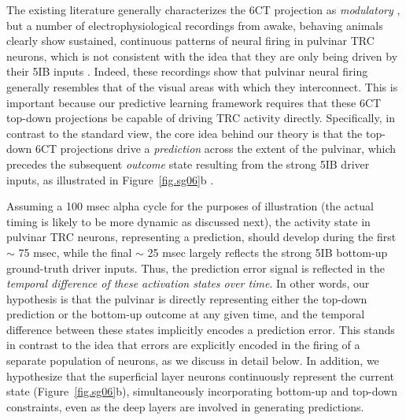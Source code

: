 \documentclass[11pt,twoside]{article}
\newif\myifpdf
\begin{document}
The existing literature generally characterizes the 6CT projection as \emph{modulatory} \citep{ShermanGuillery13,UsreySherman18}, but a number of electrophysiological recordings from awake, behaving animals clearly show sustained, continuous patterns of neural firing in pulvinar TRC neurons, which is not consistent with the idea that they are only being driven by their 5IB inputs \citep{Bender82,PetersenRobinsonKeys85,BenderYouakim01,Robinson93,SaalmannPinskWangEtAl12,KomuraNikkuniHirashimaEtAl13,ZhouSchaferDesimone16}.  Indeed, these recordings show that pulvinar neural firing generally resembles that of the visual areas with which they interconnect.  This is important because our predictive learning framework requires that these 6CT top-down projections be capable of driving TRC activity directly.  Specifically, in contrast to the standard view, the core idea behind our theory is that the top-down 6CT projections drive a \emph{prediction} across the extent of the pulvinar, which precedes the subsequent \emph{outcome} state resulting from the strong 5IB driver inputs, as illustrated in Figure~\ref{fig.sg06}b \citep{KachergisWyatteOReillyEtAl14,OReillyWyatteRohrlich14,OReillyWyatteRohrlich17}.  

Assuming a 100 msec alpha cycle for the purposes of illustration (the actual timing is likely to be more dynamic as discussed next), the activity state in pulvinar TRC neurons, representing a prediction, should develop during the first $\sim$ 75 msec, while the final $\sim$ 25 msec largely reflects the strong 5IB bottom-up ground-truth driver inputs.  Thus, the prediction error signal is reflected in the \emph{temporal difference of these activation states over time}.  In other words, our hypothesis is that the pulvinar is directly representing either the top-down prediction or the bottom-up outcome at any given time, and the temporal difference between these states implicitly encodes a prediction error. This stands in contrast to the idea that errors are explicitly encoded in the firing of a separate population of neurons, as we discuss in detail below.  In addition, we hypothesize that the superficial layer neurons continuously represent the current state (Figure~\ref{fig.sg06}b), simultaneously incorporating bottom-up and top-down constraints, even as the deep layers are involved in generating predictions.
\end{document}
